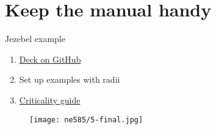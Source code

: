 \documentclass[aspectratio=1610,pdftex,dvipsnames,compress,xcolor={dvipsnames}]{beamer}
\newcommand{\acs}{\acrshort} %
\begin{document}
\section{Keep the manual handy}


\addtocounter{framenumber}{-1} 
\begin{frame}{Jezebel example}
    \begin{enumerate}[series=techniques,topsep=0pt,itemsep=21pt,leftmargin=*,label=(\arabic*)]
        \item[]\href{https://github.com/TheDoctorRAB/mcnpx.decks/blob/master/criticality/jezebel.inp}{Deck on GitHub}
        \item[]Set up examples with radii
        \item[]\href{https://www.osti.gov/servlets/purl/10171566}{Criticality guide}
    \end{enumerate}
\end{frame}


\begin{frame}[plain]{}
    \begin{figure}
        \centering
        \texttt{[image: ne585/5-final.jpg]}
    \end{figure}
\end{frame}


%
%
%



%    
%    
\end{document}
